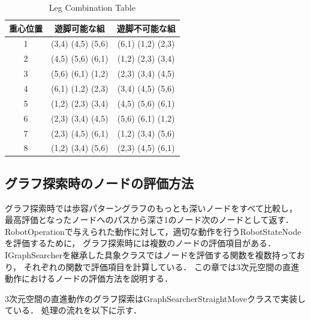 \begin{table}[h]
  \caption{Leg Combination Table}
  \label{tab:leg_combination_table}  %
  \begin{center}
    \begin{tabular}{|c|c|c|} \hline  %
      重心位置 & 遊脚可能な組 & 遊脚不可能な組  \\ \hline  %
      1 & (3,4) (4,5) (5,6) & (6,1) (1,2) (2,3) \\ \hline  %
      2 & (4,5) (5,6) (6,1) & (1,2) (2,3) (3,4) \\ \hline  %
      3 & (5,6) (6,1) (1,2) & (2,3) (3,4) (4,5) \\ \hline  %
      4 & (6,1) (1,2) (2,3) & (3,4) (4,5) (5,6) \\ \hline  %
      5 & (1,2) (2,3) (3,4) & (4,5) (5,6) (6,1) \\ \hline  %
      6 & (2,3) (3,4) (4,5) & (5,6) (6,1) (1,2) \\ \hline  %
      7 & (2,3) (4,5) (6,1) & (1,2) (3,4) (5,6) \\ \hline  %
      8 & (1,2) (3,4) (5,6) & (2,3) (4,5) (6,1) \\ \hline  %
    \end{tabular}
  \end{center}
\end{table}


\subsection{グラフ探索時のノードの評価方法}
グラフ探索時では歩容パターングラフのもっとも深いノードをすべて比較し，
最高評価となったノードへのパスから深さ1のノード次のノードとして返す．
RobotOperationで与えられた動作に対して，適切な動作を行うRobotStateNodeを評価するために，
グラフ探索時には複数のノードの評価項目がある．
IGraphSearcherを継承した具象クラスではノードを評価する関数を複数持っており，
それぞれの関数で評価項目を計算している．
この章では3次元空間の直進動作におけるノードの評価方法を説明する．

3次元空間の直進動作のグラフ探索はGraphSearcherStraightMoveクラスで実装している．
処理の流れを以下に示す．


